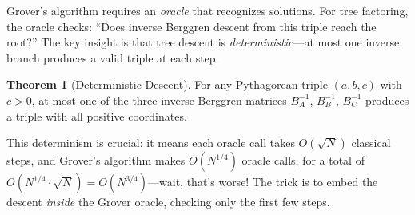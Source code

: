 \documentclass[11pt,twoside,openright]{book}
\theoremstyle{definition}
\newtheorem{theorem}{Theorem}[chapter]
\begin{document}
Grover's algorithm requires an \emph{oracle} that recognizes solutions.
For tree factoring, the oracle checks: ``Does inverse Berggren descent
from this triple reach the root?'' The key insight is that tree descent
is \emph{deterministic}---at most one inverse branch produces a valid
triple at each step.

\begin{theorem}[Deterministic Descent]
For any Pythagorean triple $(a,b,c)$ with $c > 0$, at most one of the
three inverse Berggren matrices $B_A^{-1}$, $B_B^{-1}$, $B_C^{-1}$
produces a triple with all positive coordinates.
\end{theorem}

This determinism is crucial: it means each oracle call takes $O(\sqrt{N})$
classical steps, and Grover's algorithm makes $O(N^{1/4})$ oracle calls,
for a total of $O(N^{1/4} \cdot \sqrt{N}) = O(N^{3/4})$---wait, that's
worse! The trick is to embed the descent \emph{inside} the Grover oracle,
checking only the first few steps.

\begin{center}
\end{center}
\end{document}
